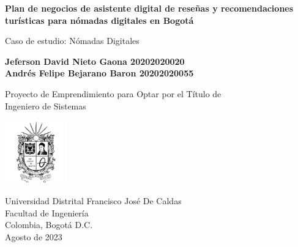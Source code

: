 \begin{titlepage}
    \begin{center}
        \vspace*{0.5cm}
            
        \Large
        \textbf{ Plan de negocios de asistente digital de reseñas y recomendaciones turísticas para nómadas digitales en Bogotá }
            
        \vspace{0.5cm}
        \large
        Caso de estudio: Nómadas Digitales 
        
        \vspace{2.5cm}
            
        \normalsize
        \textbf{Jeferson David Nieto Gaona 20202020020}\\
        \textbf{Andrés Felipe Bejarano Baron 20202020055}
            
        \vfill
            
        Proyecto de Emprendimiento para Optar por el Título de\\
        Ingeniero  de Sistemas
            
        \vspace{0.8cm}
            
        \includegraphics[width=0.2\textwidth]{Content/Images/Escudo_UD.png}
            
        \large
        Universidad Distrital Francisco José De Caldas\\
        Facultad de Ingeniería\\
        Colombia, Bogotá D.C.\\
        Agosto de 2023\\

        
            
    \end{center}
\end{titlepage}